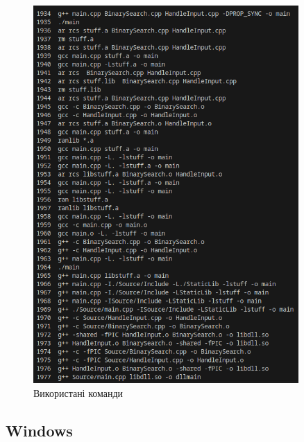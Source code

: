 \documentclass[12pt]{extarticle}
\begin{document}
\begin{figure}[H]
    \centering
    \includegraphics[width=0.90\textwidth]{console}
    \caption{Використані команди}
\end{figure}

\subsection*{Windows}
\end{document}
